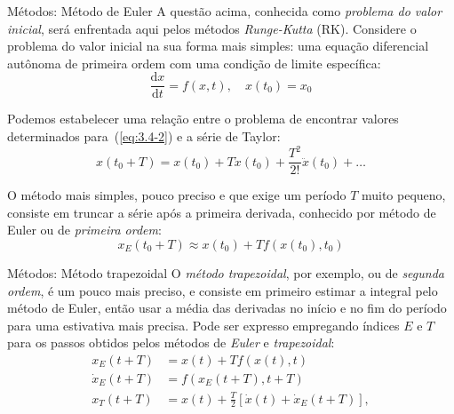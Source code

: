 \documentclass{beamer}
\begin{document}
\begin{frame}{Métodos: Método de Euler}
A questão acima, conhecida como \emph{problema do valor inicial}, será enfrentada aqui pelos métodos \emph{Runge-Kutta} (RK). Considere o problema do valor inicial na sua forma mais simples: uma equação diferencial autônoma de primeira ordem com uma condição de limite específica:
\begin{equation*}\label{eq:3.4-2}
    {\frac{\textrm{d}x}{\textrm{d}t}} = f \left( x, t \right), \quad
    x \left( t_{0} \right) = x_{0}
\end{equation*}

Podemos estabelecer uma relação entre o problema de encontrar valores determinados para~(\ref{eq:3.4-2}) e a série de Taylor:
\begin{equation*}\label{eq:3.4-3}
    x \left(t_{0} + T \right) = x \left(t_{0}\right) + T \dot{x}\left(t_{0}\right) + \frac{T^{2}}{2!} \ddot{x}\left(t_{0}\right) + \ldots
\end{equation*}

O método mais simples, pouco preciso e que exige um período \(T\) muito pequeno, consiste em truncar a série após a primeira derivada, conhecido por método de Euler ou de \emph{primeira ordem}:
\begin{equation*}\label{eq:3.4-4}
    x_{E}\left(t_{0} + T \right) \approx x \left( t_{0} \right) + T f\left(x\left(t_{0}\right), t_{0}\right)
\end{equation*}
\end{frame}

\begin{frame}{Métodos: Método trapezoidal}
O \emph{método trapezoidal}, por exemplo, ou de \emph{segunda ordem}, é um pouco mais preciso, e consiste em primeiro estimar a integral pelo método de Euler, então usar a média das derivadas no início e no fim do período para uma estivativa mais precisa. Pode ser expresso empregando índices \(E\) e \(T\) para os passos obtidos pelos métodos de \emph{Euler} e \emph{trapezoidal}:
\begin{align*}\label{eq:3.4-5}
    x_{E}\left(t + T\right) &= x\left(t\right) + T f\left(x\left(t\right),t\right) \\
    \dot{x}_{E}\left(t + T\right) &= {f{\left( x_{E} {\left( t + T \right)}, t+T \right)}} \\
    x_{T}\left(t + T\right) &= x\left(t\right) + \frac{T}{2} \left[ \dot{x}\left(t\right) + \dot{x}_{E}\left(t + T\right) \right],
\end{align*}
\end{frame}
\end{document}

